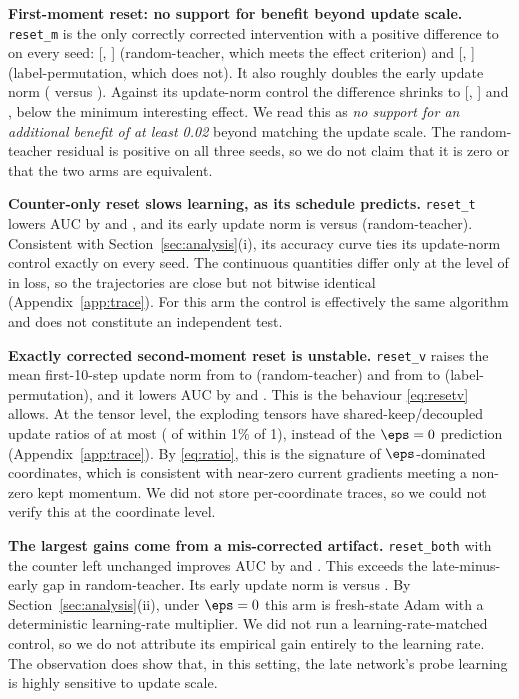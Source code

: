 \textbf{First-moment reset: no support for benefit beyond update scale.} \texttt{reset\_m} is the only
correctly corrected intervention with a positive difference to \keep{} on every seed:
\RTResetMVsKeep{} [\RTResetMVsKeepMin, \RTResetMVsKeepMax] (random-teacher, which meets the effect
criterion) and \LPResetMVsKeep{} [\LPResetMVsKeepMin, \LPResetMVsKeepMax] (label-permutation, which does
not). It also roughly doubles the early update norm (\RTResetMUpdTen{} versus \RTKeepAllUpdTen{}).
Against its update-norm control the difference shrinks to \RTResetMVsCtrl{}
[\RTResetMVsCtrlMin, \RTResetMVsCtrlMax] and \LPResetMVsCtrl{}, below the minimum interesting effect.
We read this as \emph{no support for an additional benefit of at least 0.02} beyond matching the update
scale. The random-teacher residual is positive on all three seeds, so we do not claim that it is zero or
that the two arms are equivalent.

\textbf{Counter-only reset slows learning, as its schedule predicts.} \texttt{reset\_t} lowers AUC by
\RTResetTVsKeep{} and \LPResetTVsKeep{}, and its early update norm is \RTResetTUpdTen{} versus \RTKeepAllUpdTen{} (random-teacher).
Consistent with Section~\ref{sec:analysis}(i), its accuracy curve ties its update-norm control
exactly on every seed. The continuous quantities differ only at the level of \TrajLossDiff{} in loss, so
the trajectories are close but not bitwise identical (Appendix~\ref{app:trace}). For this arm the
control is effectively the same algorithm and does not constitute an independent test.

\textbf{Exactly corrected second-moment reset is unstable.} \texttt{reset\_v} raises the mean
first-10-step update norm from \RTKeepAllUpdTen{} to \RTResetVUpdTen{} (random-teacher) and from
\LPKeepAllUpdTen{} to \LPResetVUpdTen{} (label-permutation), and it lowers AUC by \RTResetVVsKeep{} and
\LPResetVVsKeep{}. This is the behaviour \eqref{eq:resetv} allows. At the tensor level, the exploding tensors have shared-keep/decoupled update ratios of at most
\TraceVSkBigMaxRatio{} (\TraceVSkBigNearOne{} of \TraceVSkBigCount{} within 1\% of 1), instead of the
$\eps=0$ prediction \TraceVSkPred{} (Appendix~\ref{app:trace}). By \eqref{eq:ratio}, this is the signature of $\eps$-dominated
coordinates, which is consistent with near-zero current gradients meeting a non-zero kept momentum. We
did not store per-coordinate traces, so we could not verify this at the coordinate level.

\textbf{The largest gains come from a mis-corrected artifact.} \texttt{reset\_both} with the counter
left unchanged improves AUC by \RTResetBothSharedKeepVsKeep{} and \LPResetBothSharedKeepVsKeep{}. This
exceeds the late-minus-early gap in random-teacher. Its early update norm is \RTResetBothSharedKeepUpdTen{}
versus \RTKeepAllUpdTen{}. By Section~\ref{sec:analysis}(ii), under $\eps=0$ this arm is fresh-state Adam
with a deterministic learning-rate multiplier. We did not run a learning-rate-matched control, so we do
not attribute its empirical gain entirely to the learning rate. The observation does show that, in this
setting, the late network's probe learning is highly sensitive to update scale.

